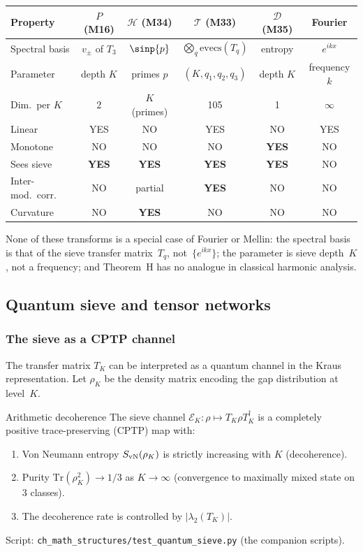 \documentclass[12pt,a4paper]{article}
\begin{document}
\begin{center}
\small
\begin{tabular}{lccccc}
\toprule
\textbf{Property} & $P$ (M16) & $\mathcal{H}$ (M34) &
  $\mathcal{T}$ (M33) & $\mathcal{D}$ (M35) & Fourier \\
\midrule
Spectral basis & $v_\pm$ of $T_3$ & $\sinp{p}$ &
  $\bigotimes_q \mathrm{evecs}(T_q)$ & entropy & $e^{ikx}$ \\
Parameter & depth $K$ & primes $p$ & $(K,q_1,q_2,q_3)$ &
  depth $K$ & frequency $k$ \\
Dim.\ per $K$ & 2 & $K$ (primes) & 105 & 1 & $\infty$ \\
Linear & YES & NO & YES & NO & YES \\
Monotone & NO & NO & NO & \textbf{YES} & NO \\
Sees sieve & \textbf{YES} & \textbf{YES} & \textbf{YES} &
  \textbf{YES} & NO \\
Inter-mod.\ corr. & NO & partial & \textbf{YES} & NO & NO \\
Curvature & NO & \textbf{YES} & NO & NO & NO \\
\bottomrule
\end{tabular}
\end{center}

None of these transforms is a special case of Fourier or Mellin:
the spectral basis is that of the sieve transfer matrix~$T_q$,
not~$\{e^{ikx}\}$; the parameter is sieve depth~$K$, not a
frequency; and Theorem~H has no analogue in classical harmonic
analysis.


\subsection{Quantum sieve and tensor networks}
\label{sec:ms_quantum}

\subsubsection{The sieve as a CPTP channel}

The transfer matrix $T_K$ can be interpreted as a quantum channel
in the Kraus representation. Let $\rho_K$ be the density matrix
encoding the gap distribution at level~$K$.

\begin{thmbox}{Arithmetic decoherence}
\label{thm:decoherence}
The sieve channel $\mathcal{E}_K\colon \rho \mapsto T_K \rho T_K^\dagger$
is a completely positive trace-preserving (CPTP) map with:
\begin{enumerate}[nosep]
\item Von Neumann entropy $S_{\rm vN}(\rho_K)$ is strictly
  increasing with $K$ (decoherence).
\item Purity $\mathrm{Tr}(\rho_K^2) \to 1/3$ as $K \to \infty$
  (convergence to maximally mixed state on 3 classes).
\item The decoherence rate is controlled by $|\lambda_2(T_K)|$.
\end{enumerate}
Script: \texttt{ch\_math\_structures/test\_quantum\_sieve.py} (the companion scripts).
\end{thmbox}
\end{document}
